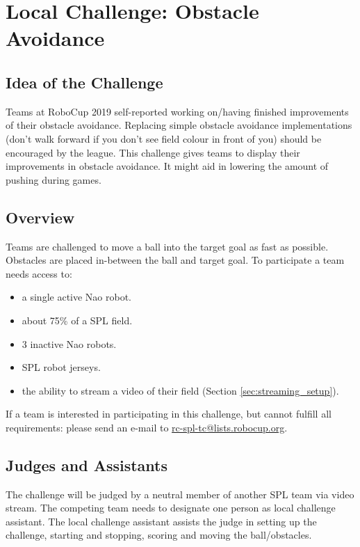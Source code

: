 \section{Local Challenge: Obstacle Avoidance}
\label{sec:ObstacleAvoidance}

\subsection{Idea of the Challenge}

Teams at RoboCup 2019 self-reported working on/having finished improvements of their obstacle avoidance. Replacing simple obstacle avoidance implementations (don't walk forward if you don't see field colour in front of you) should be encouraged by the league. This challenge gives teams to display their improvements in obstacle avoidance. It might aid in lowering the amount of pushing during games.

\subsection{Overview}

Teams are challenged to move a ball into the target goal as fast as possible. Obstacles are placed in-between the ball and target goal. To participate a team needs access to:

\begin{itemize}
	\item a single active Nao robot.
	\item about 75\% of a SPL field.
	\item 3 inactive Nao robots.
	\item SPL robot jerseys.
	\item the ability to stream a video of their field (\cf Section \ref{sec:streaming_setup}).
\end{itemize}

If a team is interested in participating in this challenge, but cannot fulfill all requirements: please send an e-mail to \url{rc-spl-tc@lists.robocup.org}.

\subsection{Judges and Assistants}

The challenge will be judged by a neutral member of another SPL team via video stream. The competing team needs to designate one person as local challenge assistant. The local challenge assistant assists the judge in setting up the challenge, starting and stopping, scoring and moving the ball/obstacles.

